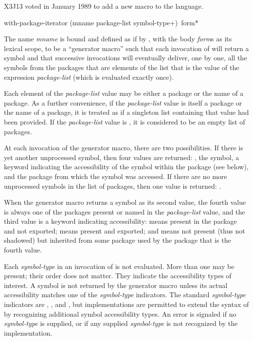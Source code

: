 \begin{new}
X3J13 voted in January 1989
to add a new macro  to the language.

\begin{defmac}
with-package-iterator (mname package-list {symbol-type}+)
                      {\,form}*

The name {\it mname} is bound and defined as if by ,
with the body {\it form\/}s as its lexical scope, to be a ``generator macro''
such that each invocation of  will
return a symbol and that successive invocations
will eventually deliver, one by one, all the symbols
from the packages that are elements of the list that is the value of the
expression {\it package-list} (which is evaluated exactly once).

Each element of the {\it package-list} value
may be either a package or the name of a package.
As a further convenience, if the {\it package-list} value
is itself a package or the name of a package, it is treated
as if a singleton list containing that value had been provided.
If the {\it package-list} value is , it is considered
to be an empty list of packages.

At each invocation of the generator macro, there are two possibilities.
If there is yet another unprocessed symbol, then
four values are returned: , the symbol,
a keyword
indicating the accessibility of the symbol within the package (see below), and
the package from which the symbol was accessed.
If there are no more unprocessed symbols in the
list of packages, then one value is returned: .

When the generator macro returns a symbol as its second value, the
fourth value is always one of the packages present or named in the
{\it package-list} value, and the third value is a keyword indicating
accessibility:
 means present in the package and not exported;
 means present and exported;
and  means not present (thus not shadowed) but inherited
from some package used by the package that is the fourth value.

Each {\it symbol-type} in an invocation of 
is not evaluated.  More than one may be present; their order does not
matter.  They indicate the accessibility types of interest.
A symbol is not returned by the generator macro unless its actual
accessibility matches one of the {\it symbol-type} indicators.
The standard {\it symbol-type} indicators are ,
, and , but implementations are permitted
to extend the syntax of  by recognizing
additional symbol accessibility types.  An error is signaled
if no {\it symbol-type} is supplied, or if any supplied {\it symbol-type}
is not recognized by the implementation.


\end{defmac}
\end{new}

